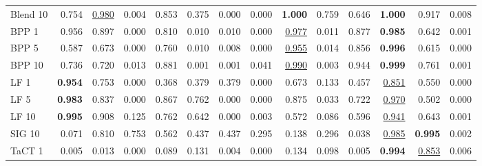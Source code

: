 \begin{table}[htbp]
\begin{adjustbox}{max width=\textwidth}
\begin{tabular}{lrrrrrrrrrrrrr}
Blend 10 & 0.754 & \underline{0.980} & \textcolor{black!45}{0.004} & 0.853 & \textcolor{black!45}{0.375} & \textcolor{black!45}{0.000} & \textcolor{black!45}{0.000} & \textbf{1.000} & 0.759 & 0.646 & \textbf{1.000} & 0.917 & \textcolor{black!45}{0.008} \\
BPP 1 & 0.956 & 0.897 & \textcolor{black!45}{0.000} & 0.810 & \textcolor{black!45}{0.010} & \textcolor{black!45}{0.010} & \textcolor{black!45}{0.000} & \underline{0.977} & \textcolor{black!45}{0.011} & 0.877 & \textbf{0.985} & 0.642 & \textcolor{black!45}{0.001} \\
BPP 5 & 0.587 & 0.673 & \textcolor{black!45}{0.000} & 0.760 & \textcolor{black!45}{0.010} & \textcolor{black!45}{0.008} & \textcolor{black!45}{0.000} & \underline{0.955} & \textcolor{black!45}{0.014} & 0.856 & \textbf{0.996} & 0.615 & \textcolor{black!45}{0.000} \\
BPP 10 & 0.736 & 0.720 & \textcolor{black!45}{0.013} & 0.881 & \textcolor{black!45}{0.001} & \textcolor{black!45}{0.001} & \textcolor{black!45}{0.041} & \underline{0.990} & \textcolor{black!45}{0.003} & 0.944 & \textbf{0.999} & 0.761 & \textcolor{black!45}{0.001} \\
LF 1 & \textbf{0.954} & 0.753 & \textcolor{black!45}{0.000} & \textcolor{black!45}{0.368} & \textcolor{black!45}{0.379} & \textcolor{black!45}{0.379} & \textcolor{black!45}{0.000} & 0.673 & \textcolor{black!45}{0.133} & \textcolor{black!45}{0.457} & \underline{0.851} & 0.550 & \textcolor{black!45}{0.000} \\
LF 5 & \textbf{0.983} & 0.837 & \textcolor{black!45}{0.000} & 0.867 & 0.762 & \textcolor{black!45}{0.000} & \textcolor{black!45}{0.000} & 0.875 & \textcolor{black!45}{0.033} & 0.722 & \underline{0.970} & 0.502 & \textcolor{black!45}{0.000} \\
LF 10 & \textbf{0.995} & 0.908 & \textcolor{black!45}{0.125} & 0.762 & 0.642 & \textcolor{black!45}{0.000} & \textcolor{black!45}{0.003} & 0.572 & \textcolor{black!45}{0.086} & 0.596 & \underline{0.941} & 0.643 & \textcolor{black!45}{0.001} \\
SIG 10 & \textcolor{black!45}{0.071} & 0.810 & 0.753 & 0.562 & \textcolor{black!45}{0.437} & \textcolor{black!45}{0.437} & \textcolor{black!45}{0.295} & \textcolor{black!45}{0.138} & \textcolor{black!45}{0.296} & \textcolor{black!45}{0.038} & \underline{0.985} & \textbf{0.995} & \textcolor{black!45}{0.002} \\
TaCT 1 & \textcolor{black!45}{0.005} & \textcolor{black!45}{0.013} & \textcolor{black!45}{0.000} & \textcolor{black!45}{0.089} & \textcolor{black!45}{0.131} & \textcolor{black!45}{0.004} & \textcolor{black!45}{0.000} & \textcolor{black!45}{0.134} & \textcolor{black!45}{0.098} & \textcolor{black!45}{0.005} & \textbf{0.994} & \underline{0.853} & \textcolor{black!45}{0.006} \\

\end{tabular}
\end{adjustbox}
\end{table}
